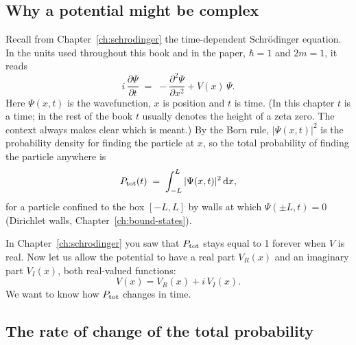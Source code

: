 \subsection{Why a potential might be complex}

Recall from Chapter~\ref{ch:schrodinger} the time-dependent Schr\"odinger equation. In the units used throughout this book and in the paper, $\hbar=1$ and $2m=1$, it reads
\begin{equation}
i\,\frac{\partial\Psi}{\partial t} \;=\; -\frac{\partial^2\Psi}{\partial x^2} + V(x)\,\Psi .
\label{eq:non-hermitian-tdse}
\end{equation}
Here $\Psi(x,t)$ is the wavefunction, $x$ is position and $t$ is time. (In this chapter $t$ is a time; in the rest of the book $t$ usually denotes the height of a zeta zero. The context always makes clear which is meant.) By the Born rule, $|\Psi(x,t)|^2$ is the probability density for finding the particle at $x$, so the total probability of finding the particle anywhere is
\begin{equation}
P_{\rm tot}(t) \;=\; \int_{-L}^{L} |\Psi(x,t)|^2\,\mathrm{d} x ,
\label{eq:non-hermitian-ptot}
\end{equation}
for a particle confined to the box $[-L,L]$ by walls at which $\Psi(\pm L,t)=0$ (Dirichlet walls, Chapter~\ref{ch:bound-states}).

In Chapter~\ref{ch:schrodinger} you saw that $P_{\rm tot}$ stays equal to 1 forever when $V$ is real. Now let us allow the potential to have a real part $V_R(x)$ and an imaginary part $V_I(x)$, both real-valued functions:
\begin{equation}
V(x) = V_R(x) + i\,V_I(x).
\label{eq:non-hermitian-complexV}
\end{equation}
We want to know how $P_{\rm tot}$ changes in time.

\subsection{The rate of change of the total probability}

